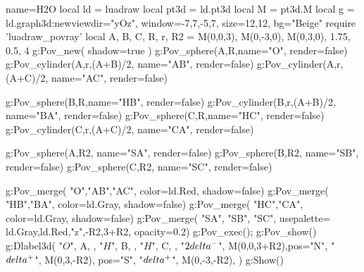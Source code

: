 \documentclass[border=5pt]{standalone}%
\begin{document}
\begin{luadraw}{name=H2O}
local ld = luadraw
local pt3d = ld.pt3d
local M = pt3d.M
local g = ld.graph3d:new{viewdir="yOz", window={-7,7,-5,7}, size={12,12},
    bg="Beige"}
require 'luadraw_povray'
local A, B, C, R, r, R2 = M(0,0,3), M(0,-3,0), M(0,3,0), 1.75, 0.5, 4
g:Pov_new( {shadow=true} )
g:Pov_sphere(A,R,{name="O", render=false})
g:Pov_cylinder(A,r,(A+B)/2, {name="AB", render=false})
g:Pov_cylinder(A,r,(A+C)/2, {name="AC", render=false})

g:Pov_sphere(B,R,{name="HB", render=false})
g:Pov_cylinder(B,r,(A+B)/2, {name="BA", render=false})
g:Pov_sphere(C,R,{name="HC", render=false})
g:Pov_cylinder(C,r,(A+C)/2, {name="CA", render=false})

g:Pov_sphere(A,R2, {name="SA", render=false})
g:Pov_sphere(B,R2, {name="SB", render=false})
g:Pov_sphere(C,R2, {name="SC", render=false})

g:Pov_merge( {"O","AB","AC"}, {color=ld.Red, shadow=false})
g:Pov_merge( {"HB","BA"}, {color=ld.Gray, shadow=false})
g:Pov_merge( {"HC","CA"}, {color=ld.Gray, shadow=false})
g:Pov_merge( {"SA", "SB", "SC"}, {usepalette={ {ld.Gray,ld.Red},"z",{-R2,3+R2}}, opacity=0.2})
g:Pov_exec(); g:Pov_show()
g:Dlabel3d( "$O$", A, {}, "$H$", B, {}, "$H$", C, {},
"$2\\delta^-$", M(0,0,3+R2),{pos="N"}, "$\\delta^+$", M(0,3,-R2), {pos="S"}, "$\\delta^+$", M(0,-3,-R2), {})
g:Show()
\end{luadraw}
\end{document}
